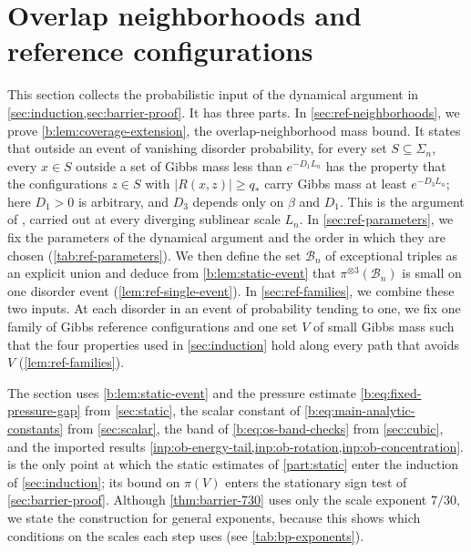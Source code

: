 \chapter{Overlap neighborhoods and reference configurations}\label{sec:references}

This section collects the probabilistic input of the dynamical argument in
\cref{sec:induction,sec:barrier-proof}. It has three parts. In
\cref{sec:ref-neighborhoods}, we prove \cref{b:lem:coverage-extension}, the
overlap-neighborhood mass bound. It states that outside an event of
vanishing disorder probability, for every set $S\subseteq\Sigma_n$, every
$x\in S$ outside a set of Gibbs mass less than $e^{-D_1L_n}$ has the property
that the configurations $z\in S$ with $|R(x,z)|\ge q_*$ carry Gibbs mass at
least $e^{-D_3L_n}$;
here $D_1>0$ is arbitrary, and $D_3$ depends only on $\beta$ and $D_1$.
This is the argument of \cite[Proposition~6.1]{oai-barriers}, carried out at
every diverging sublinear scale $L_n$. In \cref{sec:ref-parameters}, we fix the
parameters of the dynamical argument and the order in which they are chosen
(\cref{tab:ref-parameters}). We then define the set $\mathcal B_n$ of
exceptional triples as an explicit union and deduce from
\cref{b:lem:static-event} that $\pi^{\otimes3}(\mathcal B_n)$ is small on
one disorder event (\cref{lem:ref-single-event}). In
\cref{sec:ref-families}, we combine these two inputs. At each disorder in an
event of probability tending to one, we fix one family of Gibbs reference
configurations and one set $V$ of small Gibbs mass such that the four
properties used in \cref{sec:induction} hold along every path that avoids
$V$ (\cref{lem:ref-families}).

The section uses \cref{b:lem:static-event} and the pressure estimate
\eqref{b:eq:fixed-pressure-gap} from \cref{sec:static}, the scalar
constant of \eqref{b:eq:main-analytic-constants} from \cref{sec:scalar},
the band of \eqref{b:eq:os-band-checks} from \cref{sec:cubic}, and the
imported results \cref{inp:ob-energy-tail,inp:ob-rotation,inp:ob-concentration}.
 is the only point at which the static
estimates of \cref{part:static} enter the induction of \cref{sec:induction};
its bound on $\pi(V)$ enters the stationary sign test of
\cref{sec:barrier-proof}. Although \cref{thm:barrier-730} uses only the scale
exponent $7/30$, we state the construction for general exponents, because this
shows which conditions on the scales each step uses
(see \cref{tab:bp-exponents}).

